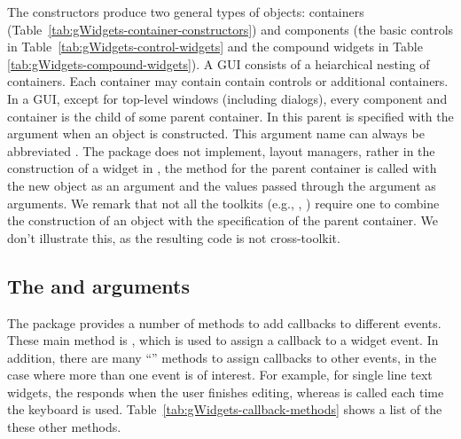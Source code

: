 The constructors produce two general types of objects: containers
(Table~\ref{tab:gWidgets-container-constructors}) and components (the
basic controls in Table~\ref{tab:gWidgets-control-widgets} and the
compound widgets in Table \ref{tab:gWidgets-compound-widgets}).  A GUI
consists of a heiarchical nesting of containers. Each container may
contain contain controls or additional containers. In a GUI, except
for top-level windows (including dialogs), every component and
container is the child of some parent container. In 
this parent is specified with the  argument when an
object is constructed. This argument name can always be abbreviated
. The package does not implement, layout managers, rather in
the construction of a widget in , the
 method for the parent container is called with the new
object as an argument and the values passed through the 
argument as arguments.  We remark that not all the toolkits (e.g.,
, ) require one to combine the construction of an object with
the specification of the parent container. We don't illustrate this,
as the resulting code is not cross-toolkit.


\subsection{The  and  arguments}
\label{sec:callbacks}







The package provides a number of methods to add callbacks to different
events. These main method is , which is used
to assign a callback to a widget event. 
In addition, there are many ``'' methods to assign
callbacks to other events, in the case where more than one event is of
interest. For example, for single line text widgets, the
 responds when the user finishes editing,
whereas  is called each time the keyboard is
used.  Table~\ref{tab:gWidgets-callback-methods} shows a list of the
these other methods. 


